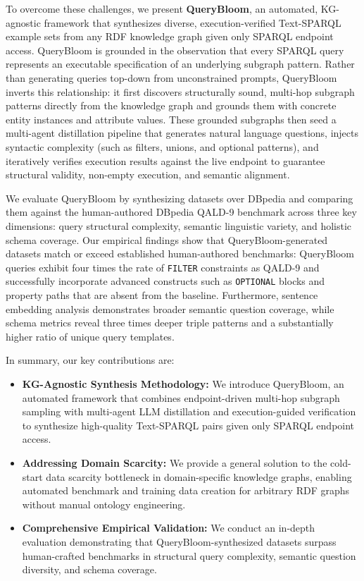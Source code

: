 To overcome these challenges, we present \textbf{QueryBloom}, an automated, KG-agnostic framework that synthesizes diverse, execution-verified Text-SPARQL example sets from any RDF knowledge graph given only SPARQL endpoint access. QueryBloom is grounded in the observation that every SPARQL query represents an executable specification of an underlying subgraph pattern. Rather than generating queries top-down from unconstrained prompts, QueryBloom inverts this relationship: it first discovers structurally sound, multi-hop subgraph patterns directly from the knowledge graph and grounds them with concrete entity instances and attribute values. These grounded subgraphs then seed a multi-agent distillation pipeline that generates natural language questions, injects syntactic complexity (such as filters, unions, and optional patterns), and iteratively verifies execution results against the live endpoint to guarantee structural validity, non-empty execution, and semantic alignment.

We evaluate QueryBloom by synthesizing datasets over DBpedia and comparing them against the human-authored DBpedia QALD-9 benchmark across three key dimensions: query structural complexity, semantic linguistic variety, and holistic schema coverage. Our empirical findings show that QueryBloom-generated datasets match or exceed established human-authored benchmarks: QueryBloom queries exhibit four times the rate of \texttt{FILTER} constraints as QALD-9 and successfully incorporate advanced constructs such as \texttt{OPTIONAL} blocks and property paths that are absent from the baseline. Furthermore, sentence embedding analysis demonstrates broader semantic question coverage, while schema metrics reveal three times deeper triple patterns and a substantially higher ratio of unique query templates.

In summary, our key contributions are:
\begin{itemize}
    \item \textbf{KG-Agnostic Synthesis Methodology:} We introduce QueryBloom, an automated framework that combines endpoint-driven multi-hop subgraph sampling with multi-agent LLM distillation and execution-guided verification to synthesize high-quality Text-SPARQL pairs given only SPARQL endpoint access.
    \item \textbf{Addressing Domain Scarcity:} We provide a general solution to the cold-start data scarcity bottleneck in domain-specific knowledge graphs, enabling automated benchmark and training data creation for arbitrary RDF graphs without manual ontology engineering.
    \item \textbf{Comprehensive Empirical Validation:} We conduct an in-depth evaluation demonstrating that QueryBloom-synthesized datasets surpass human-crafted benchmarks in structural query complexity, semantic question diversity, and schema coverage.
\end{itemize}
